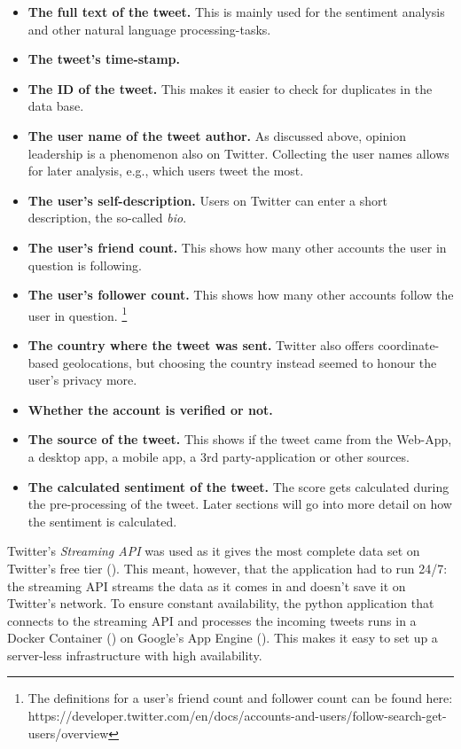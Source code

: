 \begin{itemize}
\item \textbf{The full text of the tweet.} This is mainly used for the sentiment analysis and other natural language processing-tasks.
\item \textbf{The tweet's time-stamp.}
\item \textbf{The ID of the tweet.} This makes it easier to check for duplicates in the data base. 
\item \textbf{The user name of the tweet author.} As discussed above, opinion leadership is a phenomenon also on Twitter. Collecting the user names allows for later analysis, e.g., which users tweet the most.
\item \textbf{The user's self-description.} Users on Twitter can enter a short description, the so-called \emph{bio}.
\item \textbf{The user's friend count.} This shows how many other accounts the user in question is following.
\item \textbf{The user's follower count.} This shows how many other accounts follow the user in question. \footnote{The definitions for a user's friend count and follower count can be found here: https://developer.twitter.com/en/docs/accounts-and-users/follow-search-get-users/overview}
\item \textbf{The country where the tweet was sent.} Twitter also offers coordinate-based geolocations, but choosing the country instead seemed to honour the user's privacy more.
\item \textbf{Whether the account is verified or not.}
\item \textbf{The source of the tweet.} This shows if the tweet came from the Web-App, a desktop app, a mobile app, a 3rd party-application or other sources.
\item \textbf{The calculated sentiment of the tweet.} The score gets calculated during the pre-processing of the tweet. Later sections will go into more detail on how the sentiment is calculated.
\end{itemize}


Twitter's \emph{Streaming API} was used as it gives the most complete data set on Twitter's free tier (\cite{bruns2014}). This meant, however, that the application had to run 24/7: the streaming API streams the data as it comes in and doesn't save it on Twitter's network. To ensure constant availability, the python application that connects to the streaming API and processes the incoming tweets runs in a Docker Container (\cite{merkel2014docker}) on Google's App Engine (\cite{google2020}). This makes it easy to set up a server-less infrastructure with high availability.

